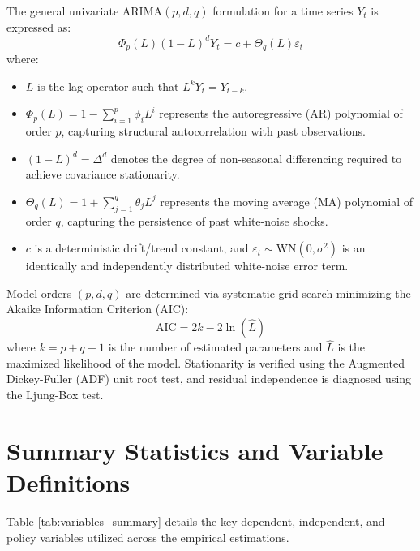 \documentclass[openany]{book}
\begin{document}
The general univariate $\text{ARIMA}(p, d, q)$ formulation for a time series $Y_t$ is expressed as:
\begin{equation}
\Phi_p(L) (1 - L)^d Y_t = c + \Theta_q(L) \varepsilon_t
\label{eq:arima_model}
\end{equation}
where:
\begin{itemize}
    \item $L$ is the lag operator such that $L^k Y_t = Y_{t-k}$.
    \item $\Phi_p(L) = 1 - \sum_{i=1}^p \phi_i L^i$ represents the autoregressive (AR) polynomial of order $p$, capturing structural autocorrelation with past observations.
    \item $(1 - L)^d = \Delta^d$ denotes the degree of non-seasonal differencing required to achieve covariance stationarity.
    \item $\Theta_q(L) = 1 + \sum_{j=1}^q \theta_j L^j$ represents the moving average (MA) polynomial of order $q$, capturing the persistence of past white-noise shocks.
    \item $c$ is a deterministic drift/trend constant, and $\varepsilon_t \sim \text{WN}(0, \sigma^2)$ is an identically and independently distributed white-noise error term.
\end{itemize}

Model orders $(p, d, q)$ are determined via systematic grid search minimizing the Akaike Information Criterion (AIC):
\begin{equation}
\text{AIC} = 2k - 2\ln(\hat{L})
\end{equation}
where $k = p + q + 1$ is the number of estimated parameters and $\hat{L}$ is the maximized likelihood of the model. Stationarity is verified using the Augmented Dickey-Fuller (ADF) unit root test, and residual independence is diagnosed using the Ljung-Box test.

\section{Summary Statistics and Variable Definitions}
Table \ref{tab:variables_summary} details the key dependent, independent, and policy variables utilized across the empirical estimations.
\end{document}
